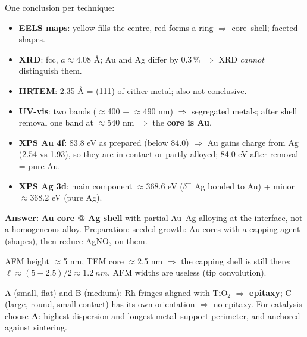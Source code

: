  One conclusion per technique:
\begin{itemize}
  \item \textbf{EELS maps}: yellow fills the centre, red forms a ring $\Rightarrow$ core--shell; faceted shapes.
  \item \textbf{XRD}: fcc, $a\approx4.08$ \AA; Au and Ag differ by 0.3\,\% $\Rightarrow$ XRD \emph{cannot} distinguish them.
  \item \textbf{HRTEM}: 2.35 \AA{} = (111) of either metal; also not conclusive.
  \item \textbf{UV-vis}: two bands ($\approx$400 + $\approx$490 nm) $\Rightarrow$ segregated metals; after shell removal one band at
        $\approx$540 nm $\Rightarrow$ the \textbf{core is Au}.
  \item \textbf{XPS Au 4f}: 83.8 eV as prepared (below 84.0) $\Rightarrow$ Au gains charge from Ag (2.54 vs 1.93), so they are in contact or partly alloyed;
        84.0 eV after removal = pure Au.
  \item \textbf{XPS Ag 3d}: main component $\approx$368.6 eV ($\delta^+$ Ag bonded to Au) + minor $\approx$368.2 eV (pure Ag)\readoff.
\end{itemize}
\textbf{Answer:} \textbf{Au core @ Ag shell} with partial Au--Ag alloying at the interface, not a homogeneous alloy.
Preparation: seeded growth: Au cores with a capping agent (shapes), then reduce AgNO$_3$ on them.

 AFM height $\approx$5 nm, TEM core $\approx$2.5 nm\readoff{} $\Rightarrow$ the capping shell is still there:
$\ell\approx(5-2.5)/2\approx\boxed{\SI{1.2}{nm}}$. AFM widths are useless (tip convolution).

 A (small, flat) and B (medium): Rh fringes aligned with TiO$_2$ $\Rightarrow$ \textbf{epitaxy}; C (large, round,
small contact) has its own orientation $\Rightarrow$ no epitaxy. For catalysis choose \textbf{A}: highest dispersion and longest
metal--support perimeter, and anchored against sintering.
